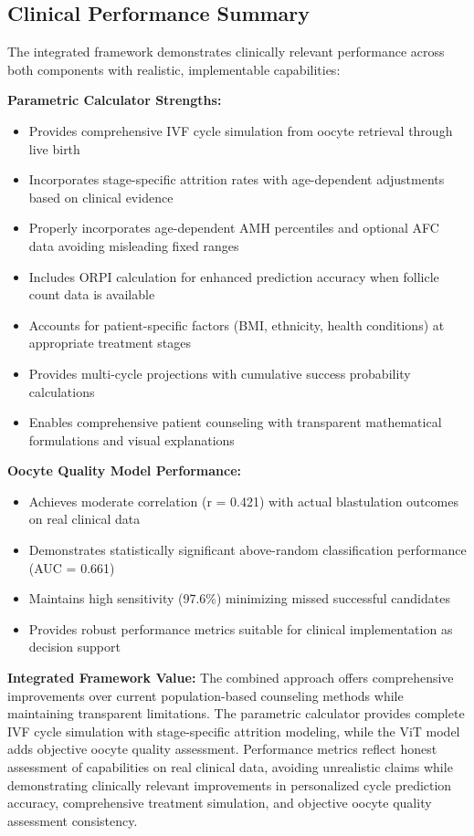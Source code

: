 \subsection{Clinical Performance Summary}

The integrated framework demonstrates clinically relevant performance across both components with realistic, implementable capabilities:

\textbf{Parametric Calculator Strengths:}
\begin{itemize}
\item Provides comprehensive IVF cycle simulation from oocyte retrieval through live birth
\item Incorporates stage-specific attrition rates with age-dependent adjustments based on clinical evidence
\item Properly incorporates age-dependent AMH percentiles and optional AFC data avoiding misleading fixed ranges
\item Includes ORPI calculation for enhanced prediction accuracy when follicle count data is available
\item Accounts for patient-specific factors (BMI, ethnicity, health conditions) at appropriate treatment stages
\item Provides multi-cycle projections with cumulative success probability calculations
\item Enables comprehensive patient counseling with transparent mathematical formulations and visual explanations
\end{itemize}

\textbf{Oocyte Quality Model Performance:}
\begin{itemize}
\item Achieves moderate correlation (r = 0.421) with actual blastulation outcomes on real clinical data
\item Demonstrates statistically significant above-random classification performance (AUC = 0.661)
\item Maintains high sensitivity (97.6\%) minimizing missed successful candidates
\item Provides robust performance metrics suitable for clinical implementation as decision support
\end{itemize}

\textbf{Integrated Framework Value:}
The combined approach offers comprehensive improvements over current population-based counseling methods while maintaining transparent limitations. The parametric calculator provides complete IVF cycle simulation with stage-specific attrition modeling, while the ViT model adds objective oocyte quality assessment. Performance metrics reflect honest assessment of capabilities on real clinical data, avoiding unrealistic claims while demonstrating clinically relevant improvements in personalized cycle prediction accuracy, comprehensive treatment simulation, and objective oocyte quality assessment consistency.

